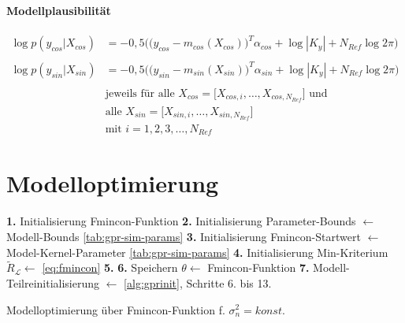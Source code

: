 \paragraph*{Modellplausibilität}


\begin{align}\label{eq:likelihoods}
	\log p(y_{cos}|X_{cos}) &= -0,5 \Big( \big( y_{cos} - m_{cos}(X_{cos}) \big)^T \alpha_{cos} + \log|K_y| + N_{Ref} \log 2\pi  \Big) \nonumber \\
	\\
	\log p(y_{sin}|X_{sin}) &= -0,5 \Big( \big( y_{sin} - m_{sin}(X_{sin}) \big)^T \alpha_{sin} + \log|K_y| + N_{Ref} \log 2\pi  \Big) \nonumber \\
	\nonumber \\
& \text{jeweils für alle } X_{cos} = \big[ X_{cos,i},\dots, X_{cos,N_{Ref}} \big] \text{ und } \nonumber \\
& \text{alle } X_{sin} = \big[ X_{sin,i},\dots, X_{sin,N_{Ref}} \big] \nonumber \\
& \text{mit } i = 1,2,3,\ldots,N_{Ref} \nonumber	
\end{align}


\clearpage


\section{Modelloptimierung}\label{sec:gpropt}


\begin{algorithm}[htp]
	\SetAlgoLined
	\textbf{1.} Initialisierung Fmincon-Funktion\;
	\textbf{2.} Initialisierung Parameter-Bounds $\leftarrow$ Modell-Bounds \autoref{tab:gpr-sim-params}\;
	\textbf{3.} Initialisierung Fmincon-Startwert $\leftarrow$ Model-Kernel-Parameter \autoref{tab:gpr-sim-params}\;
	\textbf{4.} Initialisierung Min-Kriterium $\tilde{R}_{\mathcal{L}} \leftarrow$ \autoref{eq:fmincon}\;
	\textbf{5.} 
	\textbf{6.} Speichern $\theta \leftarrow$ Fmincon-Funktion\;
	\textbf{7.} Modell-Teilreinitialisierung $\leftarrow$ \autoref{alg:gprinit}, Schritte 6. bis 13.\;
	\caption{Modelloptimierung über Fmincon-Funktion f. $\sigma_n^2 = konst.$}
	\label{alg:fminconopt}
\end{algorithm}



